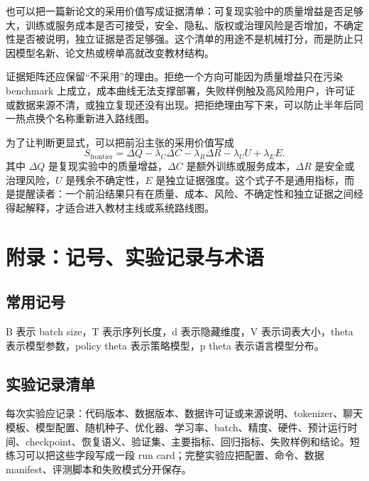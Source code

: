 \documentclass[UTF8,zihao=-4,openany]{ctexbook}
\begin{document}
也可以把一篇新论文的采用价值写成证据清单：可复现实验中的质量增益是否足够大，训练或服务成本是否可接受，安全、隐私、版权或治理风险是否增加，不确定性是否被说明，独立证据是否足够强。这个清单的用途不是机械打分，而是防止只因模型名新、论文热或榜单高就改变教材结构。

证据矩阵还应保留“不采用”的理由。拒绝一个方向可能因为质量增益只在污染 benchmark 上成立，成本曲线无法支撑部署，失败样例触及高风险用户，许可证或数据来源不清，或独立复现还没有出现。把拒绝理由写下来，可以防止半年后同一热点换个名称重新进入路线图。

为了让判断更显式，可以把前沿主张的采用价值写成
\[
  S_{\mathrm{frontier}}
  =\Delta Q-\lambda_C\Delta C-\lambda_R\Delta R-\lambda_U U+\lambda_E E .
\]
其中 $\Delta Q$ 是复现实验中的质量增益，$\Delta C$ 是额外训练或服务成本，$\Delta R$ 是安全或治理风险，$U$ 是残余不确定性，$E$ 是独立证据强度。这个式子不是通用指标，而是提醒读者：一个前沿结果只有在质量、成本、风险、不确定性和独立证据之间经得起解释，才适合进入教材主线或系统路线图。

\appendix
\chapter{附录：记号、实验记录与术语}
\section{常用记号}
B 表示 batch size，T 表示序列长度，d 表示隐藏维度，V 表示词表大小，theta 表示模型参数，policy theta 表示策略模型，p theta 表示语言模型分布。

\section{实验记录清单}
每次实验应记录：代码版本、数据版本、数据许可证或来源说明、tokenizer、聊天模板、模型配置、随机种子、优化器、学习率、batch、精度、硬件、预计运行时间、checkpoint、恢复语义、验证集、主要指标、回归指标、失败样例和结论。短练习可以把这些字段写成一段 run card；完整实验应把配置、命令、数据 manifest、评测脚本和失败模式分开保存。
\end{document}
